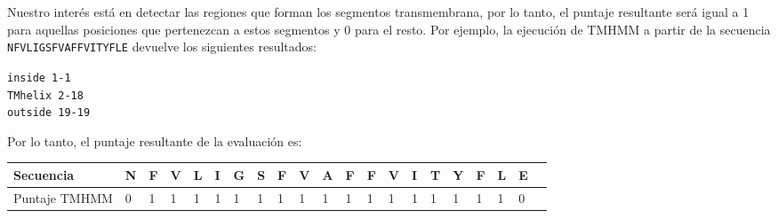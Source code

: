 Nuestro interés está en detectar las regiones que forman los segmentos transmembrana, por lo tanto, el puntaje resultante será igual a 1 para aquellas posiciones que pertenezcan a estos segmentos y 0 para el resto. 
Por ejemplo, la ejecución de TMHMM a partir de la secuencia \texttt{NFVLIGSFVAFFVITYFLE} devuelve los siguientes resultados: 

\texttt{inside         1-1}\\
\indent \texttt{TMhelix   2-18}\\
\indent \texttt{outside	    19-19}

Por lo tanto, el puntaje resultante de la evaluación es:

\vspace{0.5cm}
\noindent
\begin{adjustbox}{width=\textwidth}
\begin{tabular}{lllllllllllllllllllll} 
\hline 
Secuencia & \textbf{N} & \textbf{F} & \textbf{V} & \textbf{L} & \textbf{I} & \textbf{G} & \textbf{S} & \textbf{F} & \textbf{V} & \textbf{A} & \textbf{F} & \textbf{F} & \textbf{V} & \textbf{I} & \textbf{T} & \textbf{Y} & \textbf{F} & \textbf{L} & \textbf{E}  \\ \hline
Puntaje TMHMM & 0 & 1 & 1 & 1 & 1 & 1 & 1 & 1 & 1 & 1 & 1 & 1 & 1 & 1 & 1 & 1 & 1 & 1 & 0\\ \hline
\end{tabular}
\end{adjustbox}



 
 
 
 



% 
% 


